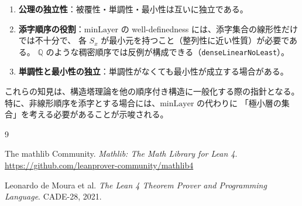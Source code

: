 \documentclass[a4paper,11pt]{ltjsarticle}
\theoremstyle{definition}
\theoremstyle{plain}
\theoremstyle{remark}
\newcommand{\minLayer}{\mathrm{minLayer}}
\begin{document}
\begin{enumerate}
    \item \textbf{公理の独立性}：被覆性・単調性・最小性は互いに独立である。
    
    \item \textbf{添字順序の役割}：$\minLayer$ の well-definedness には、添字集合の線形性だけでは不十分で、
          各 $S_x$ が最小元を持つこと（整列性に近い性質）が必要である。
          $\mathbb{Q}$ のような稠密順序では反例が構成できる（\texttt{denseLinearNoLeast}）。
    
    \item \textbf{単調性と最小性の独立}：単調性がなくても最小性が成立する場合がある。
\end{enumerate}

これらの知見は、構造塔理論を他の順序付き構造に一般化する際の指針となる。
特に、非線形順序を添字とする場合には、$\minLayer$ の代わりに
「極小層の集合」を考える必要があることが示唆される。


\begin{thebibliography}{9}

The mathlib Community.
\textit{Mathlib: The Math Library for Lean 4}.
\url{https://github.com/leanprover-community/mathlib4}

Leonardo de Moura et al.
\textit{The Lean 4 Theorem Prover and Programming Language}.
CADE-28, 2021.

\end{thebibliography}
\end{document}
